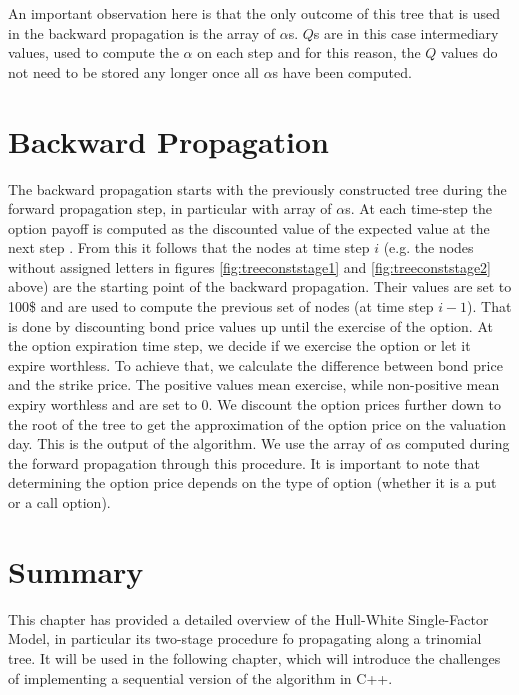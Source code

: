An important observation here is that the only outcome of this tree that is used in the backward propagation is the array of $\alpha$s. $Q$s are in this case intermediary values, used to compute the $\alpha$ on each step and for this reason, the $Q$ values do not need to be stored any longer once all $\alpha$s have been computed. 

\section{Backward Propagation}
The backward propagation starts with the previously constructed tree during the forward propagation step, in particular with array of $\alpha$s. At each time-step the option payoff is computed as the discounted value of the expected value at the next step \cite[pg. 6]{uhwirt}. From this it follows that the nodes at time step $i$ (e.g. the nodes without assigned letters in figures \ref{fig:treeconststage1} and \ref{fig:treeconststage2} above) are the starting point of the backward propagation. Their values are set to 100\$ and are used to compute the previous set of nodes (at time step $i-1$). That is done by discounting bond price values up until the exercise of the option. At the option expiration time step, we decide if we exercise the option or let it expire worthless. To achieve that, we calculate the difference between bond price and the strike price. The positive values mean exercise, while non-positive mean expiry worthless and are set to $0$. We discount the option prices further down to the root of the tree to get the approximation of the option price on the valuation day. This is the output of the algorithm. We use the array of $\alpha$s computed during the forward propagation through this procedure. It is important to note that determining the option price depends on the type of option (whether it is a put or a call option).

\section*{Summary}
This chapter has provided a detailed overview of the Hull-White Single-Factor Model, in particular its two-stage procedure fo propagating along a trinomial tree. It will be used in the following chapter, which will introduce the challenges of implementing a sequential version of the algorithm in C++.
